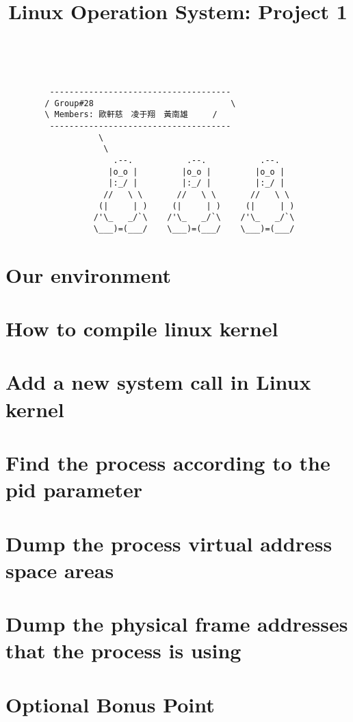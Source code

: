 \documentclass[a4paper,12pt]{report}
\title{ Linux Operation System: Project 1}
\begin{document}
\begin{titlepage}
    \centering
    \vfill
    \vfill

    \\
    \vfill
    \vfill
    \begin{verbatim}
         -------------------------------------
        / Group#28                            \
        \ Members: 歐軒慈　凌于翔　黃南雄     /
         -------------------------------------
                   \
                    \
                      .--.           .--.           .--.
                     |o_o |         |o_o |         |o_o |
                     |:_/ |         |:_/ |         |:_/ |
                    //   \ \       //   \ \       //   \ \
                   (|     | )     (|     | )     (|     | )
                  /'\_   _/`\    /'\_   _/`\    /'\_   _/`\
                  \___)=(___/    \___)=(___/    \___)=(___/

     \end{verbatim}
    \vfill
    \vfill
\end{titlepage}

\tableofcontents


\chapter{Our environment}
	
    
\chapter{How to compile linux kernel}
 	

\chapter{Add a new system call in Linux kernel}
 	
    
\chapter{Find the process according to the pid parameter}
 	
  
\chapter{Dump the process virtual address space areas}
	
  
\chapter{Dump the physical frame addresses that the process is using}
	
  
\chapter{Optional Bonus Point}
  
\end{document}
